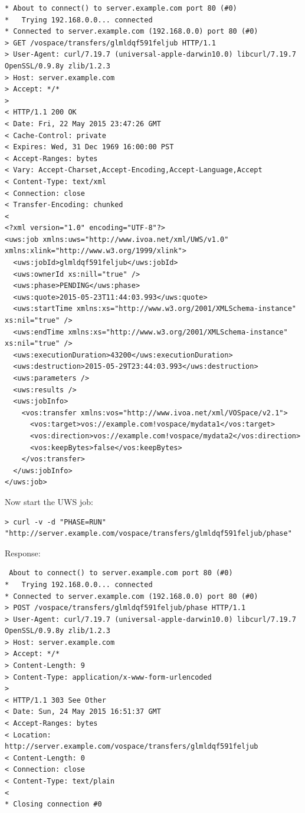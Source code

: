 \documentclass[11pt,a4paper]{ivoa}
\begin{document}
\begin{lstlisting}
* About to connect() to server.example.com port 80 (#0)
*   Trying 192.168.0.0... connected
* Connected to server.example.com (192.168.0.0) port 80 (#0)
> GET /vospace/transfers/glmldqf591feljub HTTP/1.1
> User-Agent: curl/7.19.7 (universal-apple-darwin10.0) libcurl/7.19.7 OpenSSL/0.9.8y zlib/1.2.3
> Host: server.example.com
> Accept: */*
>
< HTTP/1.1 200 OK
< Date: Fri, 22 May 2015 23:47:26 GMT
< Cache-Control: private
< Expires: Wed, 31 Dec 1969 16:00:00 PST
< Accept-Ranges: bytes
< Vary: Accept-Charset,Accept-Encoding,Accept-Language,Accept
< Content-Type: text/xml
< Connection: close
< Transfer-Encoding: chunked
<
<?xml version="1.0" encoding="UTF-8"?>
<uws:job xmlns:uws="http://www.ivoa.net/xml/UWS/v1.0" xmlns:xlink="http://www.w3.org/1999/xlink">
  <uws:jobId>glmldqf591feljub</uws:jobId>
  <uws:ownerId xs:nill="true" />
  <uws:phase>PENDING</uws:phase>
  <uws:quote>2015-05-23T11:44:03.993</uws:quote>
  <uws:startTime xmlns:xs="http://www.w3.org/2001/XMLSchema-instance" xs:nil="true" />
  <uws:endTime xmlns:xs="http://www.w3.org/2001/XMLSchema-instance" xs:nil="true" />
  <uws:executionDuration>43200</uws:executionDuration>
  <uws:destruction>2015-05-29T23:44:03.993</uws:destruction>
  <uws:parameters />
  <uws:results />
  <uws:jobInfo>
    <vos:transfer xmlns:vos="http://www.ivoa.net/xml/VOSpace/v2.1">
      <vos:target>vos://example.com!vospace/mydata1</vos:target>
      <vos:direction>vos://example.com!vospace/mydata2</vos:direction>
      <vos:keepBytes>false</vos:keepBytes>
    </vos:transfer>
  </uws:jobInfo>
</uws:job>
\end{lstlisting}
Now start the UWS job:
\begin{lstlisting}
> curl -v -d "PHASE=RUN" "http://server.example.com/vospace/transfers/glmldqf591feljub/phase"
\end{lstlisting}
Response:
\begin{lstlisting}
 About to connect() to server.example.com port 80 (#0)
*   Trying 192.168.0.0... connected
* Connected to server.example.com (192.168.0.0) port 80 (#0)
> POST /vospace/transfers/glmldqf591feljub/phase HTTP/1.1
> User-Agent: curl/7.19.7 (universal-apple-darwin10.0) libcurl/7.19.7 OpenSSL/0.9.8y zlib/1.2.3
> Host: server.example.com
> Accept: */*
> Content-Length: 9
> Content-Type: application/x-www-form-urlencoded
>
< HTTP/1.1 303 See Other
< Date: Sun, 24 May 2015 16:51:37 GMT
< Accept-Ranges: bytes
< Location: http://server.example.com/vospace/transfers/glmldqf591feljub
< Content-Length: 0
< Connection: close
< Content-Type: text/plain
<
* Closing connection #0
\end{lstlisting}
\end{document}

